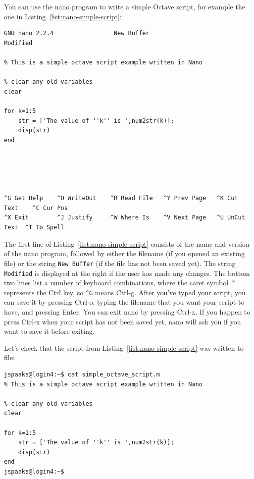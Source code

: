 You can use the nano program to write a simple Octave script, for example the one in Listing~\ref{list:nano-simple-script}:
\begin{lstlisting}[style=numbered,style=basic,style=bash,style=numbered,caption={Example of a simple Octave script in nano.},label=list:nano-simple-script]
  GNU nano 2.2.4                 New Buffer                                   Modified  

% This is a simple octave script example written in Nano

% clear any old variables
clear

for k=1:5
    str = ['The value of ''k'' is ',num2str(k)];
    disp(str)
end





^G Get Help    ^O WriteOut    ^R Read File   ^Y Prev Page   ^K Cut Text    ^C Cur Pos
^X Exit        ^J Justify     ^W Where Is    ^V Next Page   ^U UnCut Text  ^T To Spell
\end{lstlisting}
The first line of Listing~\ref{list:nano-simple-script} consists of the name and version of the nano program, followed by either the filename (if you opened an existing file) or the string \lstinline[style=bashinline]{New Buffer} (if the file has not been saved yet). The string \lstinline[style=bashinline]{Modified} is displayed at the right if the user has made any changes. The bottom two lines list a number of keyboard combinations, where the caret symbol~\lstinline[style=bashinline]{^} represents the Ctrl key, so \lstinline[style=bashinline]{^G} means Ctrl-g. After you've typed your script, you can save it by pressing Ctrl-o, typing the filename that you want your script to have, and pressing Enter. You can exit nano by pressing Ctrl-x. If you happen to press Ctrl-x when your script has not been saved yet, nano will ask you if you want to save it before exiting.

Let's check that the script from Listing~\ref{list:nano-simple-script} was written to file:
\begin{lstlisting}[style=basic,style=bash]
jspaaks@login4:~$ cat simple_octave_script.m 
% This is a simple octave script example written in Nano

% clear any old variables
clear

for k=1:5
    str = ['The value of ''k'' is ',num2str(k)];
    disp(str)
end
jspaaks@login4:~$ 
\end{lstlisting}

